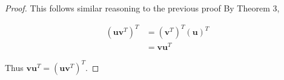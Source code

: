 \documentclass[11pt]{amsart}
\begin{document}
\begin{proof}
This follows similar reasoning to the previous proof
By Theorem 3, 

\begin{equation*}
\begin{split}
\left(\textbf{uv}^T\right)^T & =\left(\textbf{v}^T\right)^T\left(\textbf{u}\right)^T\\
& = \textbf{vu}^T
\end{split}
\end{equation*}

Thus $\textbf{vu}^T=\left(\textbf{uv}^T\right)^T$.

\end{proof}
\end{document}
